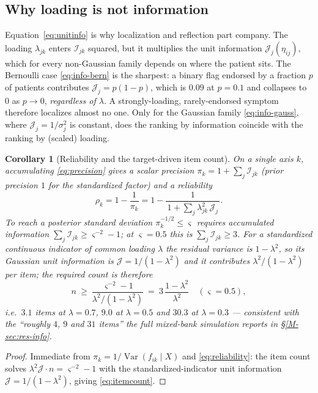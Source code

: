 \documentclass[11pt]{article}
\newcommand{\info}{\mathcal{I}}
\newcommand{\unitinfo}{\mathcal{J}}
\theoremstyle{plain}
\newtheorem{corollary}{Corollary}
\theoremstyle{definition}
\newcommand{\MSec}[1]{\S\ref{M-#1}}
\begin{document}
\subsection{Why loading is not information}
\label{sub:notloading}

Equation~\eqref{eq:unitinfo} is why localization and reflection part company. The loading
$\lambda_{jk}$ enters $\info_{jk}$ squared, but it multiplies the unit information
$\unitinfo_j(\eta_{ij})$, which for every non-Gaussian family depends on where the patient
sits. The Bernoulli case \eqref{eq:info-bern} is the sharpest: a binary flag endorsed by a
fraction $p$ of patients contributes $\unitinfo_j=p(1-p)$, which is $0.09$ at $p=0.1$ and
collapses to $0$ as $p\to0$, \emph{regardless of $\lambda$}. A strongly-loading, rarely-endorsed
symptom therefore localizes almost no one. Only for the Gaussian family
\eqref{eq:info-gauss}, where $\unitinfo_j=1/\sigma_j^2$ is constant, does the ranking by
information coincide with the ranking by (scaled) loading.

\begin{corollary}[Reliability and the target-driven item count]\label{cor:reliability}
On a single axis $k$, accumulating \eqref{eq:precision} gives a scalar precision
$\pi_k=1+\sum_{j}\info_{jk}$ (prior precision $1$ for the standardized factor) and a
reliability
\begin{equation}
  \rho_k=1-\frac{1}{\pi_k}=1-\frac{1}{\,1+\sum_j \lambda_{jk}^2\,\unitinfo_j\,}.
  \label{eq:reliability}
\end{equation}
To reach a posterior standard deviation $\pi_k^{-1/2}\le\varsigma$ requires accumulated
information $\sum_j\info_{jk}\ge \varsigma^{-2}-1$; at $\varsigma=0.5$ this is
$\sum_j\info_{jk}\ge 3$. For a standardized continuous indicator of common loading
$\lambda$ the residual variance is $1-\lambda^2$, so its Gaussian unit information is
$\unitinfo=1/(1-\lambda^2)$ and it contributes $\lambda^2/(1-\lambda^2)$ per item; the
required count is therefore
\begin{equation}
  n \ \ge\ \frac{\varsigma^{-2}-1}{\lambda^2/(1-\lambda^2)}
  \ =\ 3\,\frac{1-\lambda^2}{\lambda^2}\quad(\varsigma=0.5),
  \label{eq:itemcount}
\end{equation}
i.e.\ $3.1$ items at $\lambda=0.7$, $9.0$ at $\lambda=0.5$ and $30.3$ at $\lambda=0.3$ ---
consistent with the ``roughly $4$, $9$ and $31$ items'' the full mixed-bank simulation
reports in \MSec{sec:res-info}.
\end{corollary}
\begin{proof}
Immediate from $\pi_k=1/\operatorname{Var}(f_{ik}\mid X)$ and \eqref{eq:reliability}: the
item count solves $\lambda^2\unitinfo\cdot n=\varsigma^{-2}-1$ with the standardized-indicator
unit information $\unitinfo=1/(1-\lambda^2)$, giving \eqref{eq:itemcount}.
\end{proof}
\end{document}
